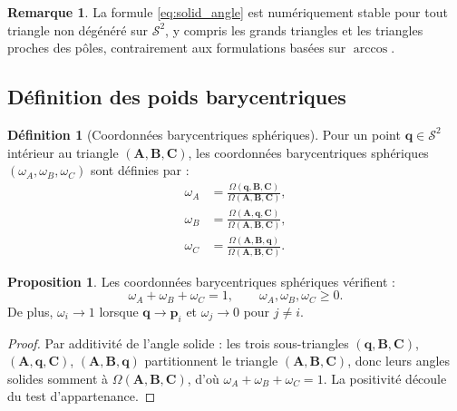 \documentclass[12pt, a4paper]{article}
\theoremstyle{definition}
\newtheorem{definition}{Définition}[section]
\newtheorem{proposition}{Proposition}[section]
\newtheorem{remarque}{Remarque}[section]
\newcommand{\vect}[1]{\bm{#1}}
\begin{document}
\begin{remarque}
  La formule \eqref{eq:solid_angle} est numériquement stable pour tout triangle
  non dégénéré sur $\mathcal{S}^2$, y compris les grands triangles et les
  triangles proches des pôles, contrairement aux formulations basées sur
  $\arccos$.
\end{remarque}

\subsection{Définition des poids barycentriques}

\begin{definition}[Coordonnées barycentriques sphériques]
  Pour un point $\vect{q} \in \mathcal{S}^2$ intérieur au triangle
  $(\vect{A}, \vect{B}, \vect{C})$, les coordonnées barycentriques sphériques
  $(\omega_A, \omega_B, \omega_C)$ sont définies par :
  \begin{align}
    \omega_A &= \frac{\Omega(\vect{q}, \vect{B}, \vect{C})}
                     {\Omega(\vect{A}, \vect{B}, \vect{C})}, \\
    \omega_B &= \frac{\Omega(\vect{A}, \vect{q}, \vect{C})}
                     {\Omega(\vect{A}, \vect{B}, \vect{C})}, \\
    \omega_C &= \frac{\Omega(\vect{A}, \vect{B}, \vect{q})}
                     {\Omega(\vect{A}, \vect{B}, \vect{C})}.
  \end{align}
\end{definition}

\begin{proposition}
  Les coordonnées barycentriques sphériques vérifient :
  \begin{equation}
    \omega_A + \omega_B + \omega_C = 1, \qquad \omega_A, \omega_B, \omega_C \geq 0.
  \end{equation}
  De plus, $\omega_i \to 1$ lorsque $\vect{q} \to \vect{p}_i$ et
  $\omega_j \to 0$ pour $j \neq i$.
\end{proposition}

\begin{proof}
  Par additivité de l'angle solide : les trois sous-triangles
  $(\vect{q},\vect{B},\vect{C})$, $(\vect{A},\vect{q},\vect{C})$,
  $(\vect{A},\vect{B},\vect{q})$ partitionnent le triangle
  $(\vect{A},\vect{B},\vect{C})$, donc leurs angles solides somment à
  $\Omega(\vect{A},\vect{B},\vect{C})$, d'où $\omega_A + \omega_B + \omega_C = 1$.
  La positivité découle du test d'appartenance.
\end{proof}
\end{document}
